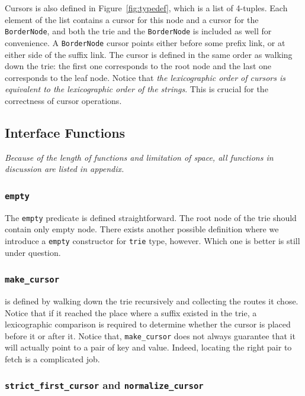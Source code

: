 \documentclass[runningheads]{llncs}
\begin{document}
Cursors is also defined in Figure~\ref{fig:typedef}, which is a list of
4-tuples. Each element of the list contains a cursor for this node and a cursor
for the \texttt{BorderNode}, and both the trie and the \texttt{BorderNode} is
included as well for convenience. A \texttt{BorderNode} cursor points either
before some prefix link, or at either side of the suffix link. The cursor is
defined in the same order as walking down the trie: the first one corresponds to
the root node and the last one corresponds to the leaf node. Notice that
\emph{the lexicographic order of cursors is equivalent to the lexicographic
  order of the strings}. This is crucial for the correctness of cursor
operations.

\subsection{Interface Functions}

\emph{Because of the length of functions and limitation of space, all functions
  in discussion are listed in appendix.}

\subsubsection{\texttt{empty}}

The \texttt{empty} predicate is defined straightforward. The root node of the trie
should contain only empty node. There exists another possible definition where
we introduce a \texttt{empty} constructor for \texttt{trie} type, however. Which
one is better is still under question.

\subsubsection{\texttt{make\_cursor}}

is defined by walking down the trie recursively and collecting the routes it
chose. Notice that if it reached the place where a suffix existed in the trie, a
lexicographic comparison is required to determine whether the cursor is placed
before it or after it. Notice that, \texttt{make\_cursor} does not always
guarantee that it will actually point to a pair of key and value. Indeed,
locating the right pair to fetch is a complicated job.


\subsubsection{\texttt{strict\_first\_cursor} and \texttt{normalize\_cursor}}
\end{document}
